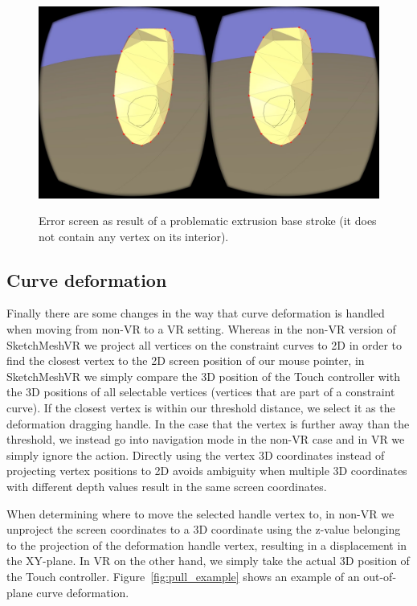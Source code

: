 \begin{figure}[!h]
    \centering
    \includegraphics[width=0.7260\linewidth]{figures/error_extrusion}\\
    \caption[Error screen as result of a problematic extrusion base stroke]{Error screen as result of a problematic extrusion base stroke (it does not contain any vertex on its interior).
      \label{fig:errordisplay}}
\end{figure}

\subsection{Curve deformation}
Finally there are some changes in the way that curve deformation is handled when moving from non-VR to a VR setting. Whereas in the non-VR version of SketchMeshVR we project all vertices on the constraint curves to 2D in order to find the closest vertex to the 2D screen position of our mouse pointer, in SketchMeshVR we simply compare the 3D position of the Touch controller with the 3D positions of all selectable vertices (vertices that are part of a constraint curve). If the closest vertex is within our threshold distance, we select it as the deformation dragging handle. In the case that the vertex is further away than the threshold, we instead go into navigation mode in the non-VR case and in VR we simply ignore the action. Directly using the vertex 3D coordinates instead of projecting vertex positions to 2D avoids ambiguity when multiple 3D coordinates with different depth values result in the same screen coordinates. 

When determining where to move the selected handle vertex to, in non-VR we unproject the screen coordinates to a 3D coordinate using the z-value belonging to the projection of the deformation handle vertex, resulting in a displacement in the XY-plane. In VR on the other hand, we simply take the actual 3D position of the Touch controller. Figure~\ref{fig:pull_example} shows an example of an out-of-plane curve deformation.

